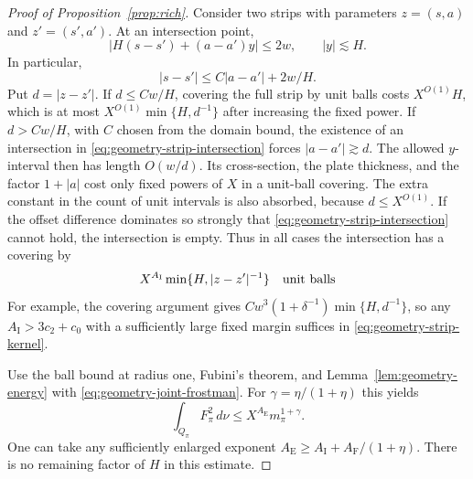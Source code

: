 \begin{proof}[Proof of Proposition~\ref{prop:rich}]
Consider two strips with parameters $z=(s,a)$ and $z'=(s',a')$.
At an intersection point,
\begin{equation}\label{eq:geometry-strip-intersection}
 |H(s-s')+(a-a')y|\leq2w,\qquad |y|\lesssim H.
\end{equation}
In particular,
\[
 |s-s'|\leq C|a-a'|+2w/H.
\]
Put $d=|z-z'|$. If $d\leq Cw/H$, covering the full strip by unit
balls costs $X^{O(1)}H$, which is at most
$X^{O(1)}\min\{H,d^{-1}\}$ after increasing the fixed power.
If $d>Cw/H$, with $C$ chosen from the domain bound, the existence
of an intersection in \eqref{eq:geometry-strip-intersection}
forces $|a-a'|\gtrsim d$. The allowed $y$-interval then has length
$O(w/d)$. Its cross-section, the plate thickness, and the factor
$1+|a|$ cost only fixed powers of $X$ in a unit-ball covering.
The extra constant in the count of unit intervals is also absorbed,
because $d\leq X^{O(1)}$. If the offset difference dominates so
strongly that \eqref{eq:geometry-strip-intersection} cannot hold,
the intersection is empty. Thus in all cases the intersection has
a covering by
\begin{equation}\label{eq:geometry-strip-kernel}
 X^{A_{\mathrm I}}\min\{H,|z-z'|^{-1}\}
 \quad\hbox{unit balls}
\end{equation}
For example, the covering argument gives
$Cw^3(1+\delta^{-1})\min\{H,d^{-1}\}$, so any
$A_{\mathrm I}>3c_2+c_0$ with a sufficiently large fixed margin
suffices in \eqref{eq:geometry-strip-kernel}.

Use the ball bound at radius one, Fubini's theorem, and
Lemma~\ref{lem:geometry-energy} with
\eqref{eq:geometry-joint-frostman}. For
$\gamma=\eta/(1+\eta)$ this yields
\begin{equation}\label{eq:geometry-strip-energy}
 \int_{Q_\pi}F_\pi^2\,d\nu
 \leq X^{A_{\mathrm E}}m_\pi^{1+\gamma}.
\end{equation}
One can take any sufficiently enlarged exponent
$A_{\mathrm E}\geq A_{\mathrm I}+A_{\mathrm F}/(1+\eta)$.
There is no remaining factor of $H$ in this estimate.


\end{proof}
